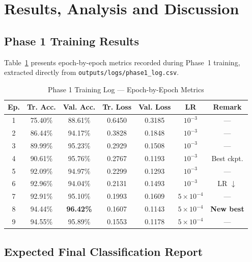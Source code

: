 \documentclass[12pt, a4paper, onecolumn]{IEEEtran}
\begin{document}
\section{Results, Analysis and Discussion}

\subsection{Phase 1 Training Results}

Table~\ref{tab:phase1log} presents epoch-by-epoch metrics recorded during Phase~1 training, extracted
directly from \texttt{outputs/logs/phase1\_log.csv}.

\begin{table}[H]
  \centering
  \caption{Phase 1 Training Log --- Epoch-by-Epoch Metrics}
  \label{tab:phase1log}
  \begin{tabular}{ccccccc}
    \toprule
    \textbf{Ep.} & \textbf{Tr. Acc.} & \textbf{Val. Acc.} & \textbf{Tr. Loss} & \textbf{Val. Loss} & \textbf{LR} & \textbf{Remark} \\
    \midrule
    1 & 75.40\% & 88.61\% & 0.6450 & 0.3185 & $10^{-3}$ & --- \\
    2 & 86.44\% & 94.17\% & 0.3828 & 0.1848 & $10^{-3}$ & --- \\
    3 & 89.99\% & 95.23\% & 0.2929 & 0.1508 & $10^{-3}$ & --- \\
    4 & 90.61\% & 95.76\% & 0.2767 & 0.1193 & $10^{-3}$ & Best ckpt. \\
    5 & 92.09\% & 94.97\% & 0.2299 & 0.1293 & $10^{-3}$ & --- \\
    6 & 92.96\% & 94.04\% & 0.2131 & 0.1493 & $10^{-3}$ & LR $\downarrow$ \\
    7 & 92.91\% & 95.10\% & 0.1993 & 0.1609 & $5\!\times\!10^{-4}$ & --- \\
    8 & 94.44\% & \textbf{96.42\%} & 0.1607 & 0.1143 & $5\!\times\!10^{-4}$ & \textbf{New best} \\
    9 & 94.55\% & 95.89\% & 0.1553 & 0.1178 & $5\!\times\!10^{-4}$ & --- \\
    \bottomrule
  \end{tabular}
\end{table}

\subsection{Expected Final Classification Report}
\end{document}
